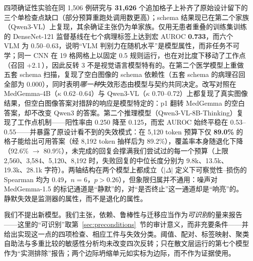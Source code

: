 四项确证性实验在同 1,506 例研究与 \textbf{31,626} 个追加格子上补齐了原始设计留下的三个单检查点缺口（部分预算重跑处调用数更高）；schema 结果现已在第二个家族（Qwen3-VL）上复现，其余确证主张仍为单家族。仅用无患者重叠的训练集训练的 DenseNet-121 监督基线在七个病理标签上达到宏 AUROC \textbf{0.733}，而六个 VLM 为 0.50--0.63，说明``VLM 判别力在随机水平''是模型属性，而非任务不可学；同一 CNN 在 19 格网格上以固定 0.5 规则运行，也在对比度下移动了工作点（召回 +2.1\,\pp{}），因此反转 3 不是视觉语言模型特有的。在第二个医学模型上重做五套 schema 扫描，复现了空白图像的 schema 依赖性（五套 schema 的病理召回全部为 0.000），同时表明\emph{哪一种}失效形态由模型与契约共同决定。改写对照在 MedGemma-4B（$\kappa$ 0.62--0.64）与 Qwen3-VL（$\kappa$ 0.70--0.72）上都复现了真实图像结果，但空白图像答案对措辞的响应是模型特定的：p1 翻转 MedGemma 的空白答案，却不改变 Qwen3 的答案。第二个推理模型（Qwen3-VL-8B-Thinking）复现了工作点机制——阳性率由 0.250 降至 0.125，而宏 AUROC 始终平稳在 0.53--0.55——并暴露了原设计看不到的失效模式：在 5,120 token 预算下仅 \textbf{89.0\%} 的格子能给出可用答案（经 8,192 token 抽样后为 89.2\%），覆盖率本身随退化下降（92.6\% $\rightarrow$ 80.9\%），未完成的回复会撑满我们尝试过的每一个预算（上限 2,560、3,584、5,120、8,192 时，失败回复的中位长度分别为 9.8k、13.5k、19.3k、28.1k 字符）。两轴结构在两个模型上都成立（$|\Delta|$ 定义下可察觉性--损伤的 Spearman 均为 0.49，$n=6$，$p>0.26$），但象限归属并不通用：噪声对 MedGemma-1.5 的标记通道是``静默''的，对``是否终止''这一通道却是``响亮''的。静默失效是监测器的属性，而不是退化的属性。

我们不提出新模型。我们主张，依赖、鲁棒性与迁移应当作为\emph{可识别}的量来报告——这里的``可识别''取第~\ref{sec:preconditions}~节的审计意义，而非充要条件——并给出实现这一点的四项检查、相应工件与失效分类。阈值、配对、标签映射、聚类自助法与多重比较的敏感性分析均未改变四次反转；只在散文层运行的第七个模型作为``实测排除''报告；两个边际坍缩单元如实标为边际，而不作为证据使用。
